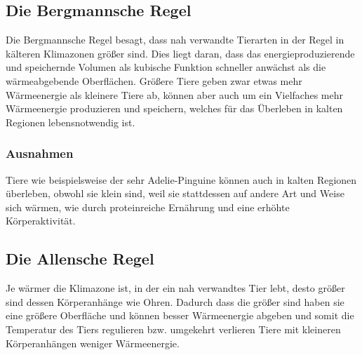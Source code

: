 \documentclass{article}
\begin{document}
\subsection{Die Bergmannsche Regel}
Die Bergmannsche Regel besagt, dass nah verwandte Tierarten in der Regel in kälteren Klimazonen größer sind. Dies liegt daran, dass das energieproduzierende und speichernde Volumen als kubische Funktion schneller anwächst als die wärmeabgebende Oberflächen. Größere Tiere geben zwar etwas mehr Wärmeenergie als kleinere Tiere ab, können aber auch um ein Vielfaches mehr Wärmeenergie produzieren und speichern, welches für das Überleben in kalten Regionen lebensnotwendig ist.
 
\subsubsection{Ausnahmen}
Tiere wie beispielsweise der sehr Adelie-Pinguine können auch in kalten Regionen überleben, obwohl sie klein sind, weil sie stattdessen auf andere Art und Weise sich wärmen, wie durch proteinreiche Ernährung und eine erhöhte Körperaktivität.
 
\subsection{Die Allensche Regel}
Je wärmer die Klimazone ist, in der ein nah verwandtes Tier lebt, desto größer sind dessen Körperanhänge wie Ohren. Dadurch dass die größer sind haben sie eine größere Oberfläche und können besser Wärmeenergie abgeben und somit die Temperatur des Tiers regulieren bzw. umgekehrt verlieren Tiere mit kleineren Körperanhängen weniger Wärmeenergie.
 
\end{document}
